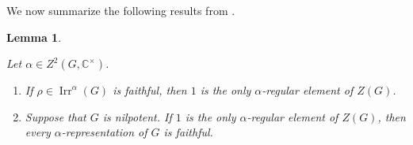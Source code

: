 \documentclass[a4paper,11pt]{amsart}
\numberwithin{equation}{section}
\numberwithin{equation}{subsection}
\newtheorem{corollary}[theorem]{Corollary}
\newtheorem{lemma}[theorem]{Lemma}
\newtheorem{remark}[theorem]{Remark}
\newcommand{\C}{\mathbb{C}}
\newcommand{\poonam}[1]{{\color{blue} #1}}
\begin{document}

	
	We now summarize the following results from  \cite[Chapter 10, Lemma 4.3, Lemma 4.12]{karpilovsky}.
	
	\begin{lemma} \label{faithful projective representation}
		
		
		Let $\alpha \in Z^2(G,\mathbb{C}^{\times})$.
		\begin{enumerate}
			\item If $\rho \in \operatorname{Irr}^{\alpha}(G)$ is faithful, then $1$ is the only $\alpha$-regular element of $Z(G)$.
			
			\item Suppose that $G$ is nilpotent. If $1$ is the only $\alpha$-regular element of $Z(G)$, then every $\alpha$-representation of $G$ is faithful.
			
		\end{enumerate}
	\end{lemma}
	
\end{document}
